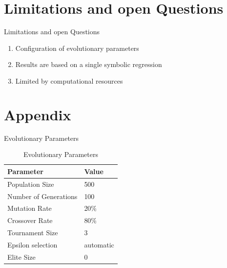 \documentclass[
  ignorenonframetext,
]{beamer}
\providecommand{\tightlist}{%
  \setlength{\itemsep}{0pt}\setlength{\parskip}{0pt}}
\begin{document}
\hypertarget{limitations-and-open-questions}{%
\section{Limitations and open
Questions}\label{limitations-and-open-questions}}

\begin{frame}{Limitations and open Questions}
\begin{enumerate}
\tightlist
\item
  Configuration of evolutionary parameters
\item
  Results are based on a single symbolic regression
\item
  Limited by computational resources
\end{enumerate}
\end{frame}

\hypertarget{appendix}{%
\section{Appendix}\label{appendix}}

\begin{frame}{Evolutionary Parameters}
\protect\hypertarget{evolutionary-parameters}{}
\begin{table}

\caption{\label{tab:ea_config_table}Evolutionary Parameters}
\centering
\begin{tabular}[t]{l|l}
\hline
Parameter & Value\\
\hline
Population Size & 500\\
\hline
Number of Generations & 100\\
\hline
Mutation Rate & 20\%\\
\hline
Crossover Rate & 80\%\\
\hline
Tournament Size & 3\\
\hline
Epsilon selection & automatic\\
\hline
Elite Size & 0\\
\hline
\end{tabular}
\end{table}
\end{frame}
\end{document}
